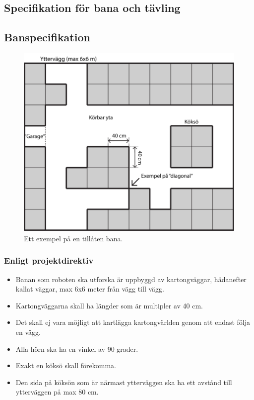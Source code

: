 \documentclass[a4paper,11pt]{article}
\begin{document}
\begin{appendices}

\section{Specifikation för bana och tävling}

\subsection{Banspecifikation} \label{sec:courseSpecification}

\begin{figure}[h!]
\centering
\includegraphics[scale=0.30]{banexempel.png}
\caption{Ett exempel på en tillåten bana.}
\end{figure}

\subsubsection{Enligt projektdirektiv}
\begin{itemize}
    \item Banan som roboten ska utforska är uppbyggd av kartongväggar, hädanefter kallat väggar, max 6x6 meter från vägg till vägg.
    \item Kartongväggarna skall ha längder som är multipler av 40 cm.
    \item Det skall ej vara möjligt att kartlägga kartongvärlden genom att endast följa en vägg.
    \item Alla hörn ska ha en vinkel av 90 grader.
    \item Exakt en köksö skall förekomma.
    \item Den sida på köksön som är närmast ytterväggen ska ha ett avstånd till ytterväggen på max 80 cm.
\end{itemize}


\end{appendices}
\end{document}
